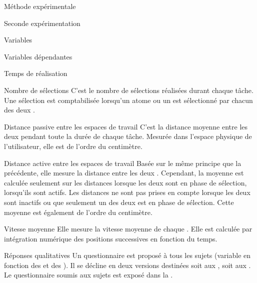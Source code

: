 \documentclass[myfrancais]{mythesis}
\begin{document}
\begin{mychapter}{Méthode expérimentale}
\begin{mysection}{Seconde expérimentation}
\begin{mysubsection}{Variables}
\begin{mysubsubsection}{Variables dépendantes}
\begin{myparagraph}{ Temps de réalisation}
					\end{myparagraph}
					\begin{myparagraph}{ Nombre de sélections}
						C'est le nombre de sélections réalisées durant chaque tâche.
						Une sélection est comptabilisée lorsqu'un atome ou un  est sélectionné par chacun des deux .
					\end{myparagraph}
					\begin{myparagraph}{ Distance passive entre les espaces de travail}
						C'est la distance moyenne entre les deux  pendant toute la durée de chaque tâche.
						Mesurée dans l'espace physique de l'utilisateur, elle est de l'ordre du centimètre.
					\end{myparagraph}
					\begin{myparagraph}{ Distance active entre les espaces de travail}
						Basée sur le même principe que la précédente, elle mesure la distance entre les deux .
						Cependant, la moyenne est calculée seulement sur les distances lorsque les deux  sont en phase de sélection, lorsqu'ils sont actifs.
						Les distances ne sont pas prises en compte lorsque les deux  sont inactifs ou que seulement un des deux est en phase de sélection.
						Cette moyenne est également de l'ordre du centimètre.
					\end{myparagraph}
					\begin{myparagraph}{ Vitesse moyenne}
						Elle mesure la vitesse moyenne de chaque .
						Elle est calculée par intégration numérique des positions successives en fonction du temps.
					\end{myparagraph}
					\begin{myparagraph}{ Réponses qualitatives}
						Un questionnaire est proposé à tous les sujets (variable en fonction des  et des ).
						Il se décline en deux versions destinées soit aux , soit aux .
						Le questionnaire soumis aux sujets est exposé dans la .
					\end{myparagraph}
				\end{mysubsubsection}

\end{mysubsection}
\end{mysection}
\end{mychapter}
\end{document}
